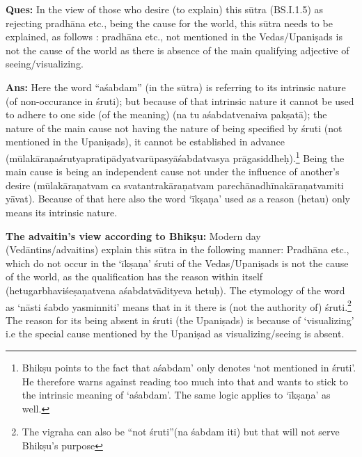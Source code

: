 \textbf{Ques:} In the view of those who desire (to explain) this sūtra (BS.I.1.5) as rejecting pradhāna etc., being the cause for the world, this sūtra needs to be explained, as follows : pradhāna etc., not mentioned in the Vedas/Upaniṣads is not the cause of the world as there is absence of the main qualifying adjective of seeing/visualizing. 

\textbf{Ans:} Here the word “aśabdam” (in the sūtra) is referring to its intrinsic nature (of non-occurance in śruti); but because of  that intrinsic nature it cannot be used to adhere to one side (of the meaning) (na tu aśabdatvenaiva pakṣatā); the nature of the main cause not having the nature of being specified by śruti (not mentioned in the Upaniṣads), it cannot be established in advance (mūlakāraṇaśrutyapratipādyatvarūpasyāśabdatvasya prāgasiddheḥ).\footnote{Bhikṣu points to the fact that aśabdam’ only denotes ‘not mentioned in śruti’. He therefore warns against reading too much into that and wants to stick to the intrinsic meaning of ‘aśabdam’. The same logic applies to ‘īkṣaṇa’ as well.} Being the main cause is being an independent cause not under the influence of another’s desire (mūlakā\-raṇatvam ca svatantrakāraṇatvam parechānadhīnakāraṇatvamiti yāvat). Because of that here also the word ‘īkṣaṇa’ used as a reason (hetau) only means its intrinsic nature. 

\textbf{The advaitin’s view according to Bhikṣu:} Modern day (Vedāntins/\-advaitins) explain this sūtra in the following manner: Pradhāna etc., which do not occur in the ‘īkṣaṇa’ śruti of the Vedas/Upaniṣads is not the cause of the world, as the qualification has the reason within itself (hetugarbhaviśeṣaṇatvena  aśabdatvādityeva hetuḥ).  The etymology of the word as ‘nāsti śabdo yasminniti’ means that in it there is (not the authority of) śruti.\footnote{The vigraha can also be “not śruti”(na śabdam iti) but that will not serve Bhikṣu’s purpose} The reason for its being absent in śruti (the Upaniṣads) is because of ‘visualizing’ i.e the special cause mentioned by the Upaniṣad as visualizing/seeing is absent. 

